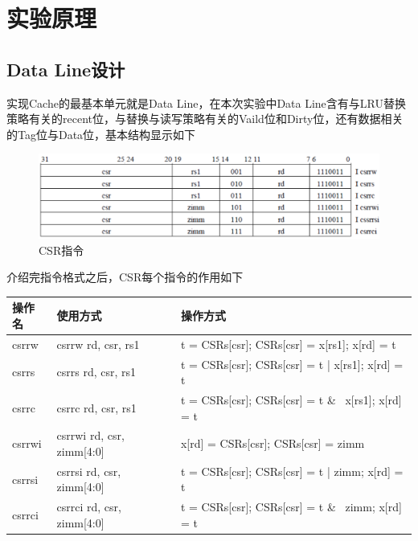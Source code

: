 
\section{实验原理}
\subsection{Data Line设计}
实现Cache的最基本单元就是Data Line，在本次实验中Data Line含有与LRU替换策略有关的recent位，与替换与读写策略有关的Vaild位和Dirty位，还有数据相关的Tag位与Data位，基本结构显示如下\\

\begin{figure}[H] %
    \centering %
    \includegraphics[width=1.0\textwidth]{figs/csr.png} %
    \caption{CSR指令} %
    \label{Fig.1} %
\end{figure}

介绍完指令格式之后，CSR每个指令的作用如下\\

\begin{tabular}{|l|l|l|}
    \hline
    操作名 & 使用方式 & 操作方式\\
    \hline
    csrrw & csrrw rd, csr, rs1 & t = CSRs[csr]; CSRs[csr] = x[rs1]; x[rd] = t \\
    \hline
    csrrs & csrrs rd, csr, rs1 & t = CSRs[csr]; CSRs[csr] = t | x[rs1]; x[rd] = t \\
    \hline
    csrrc & csrrc rd, csr, rs1  & t = CSRs[csr]; CSRs[csr] = t \& ~x[rs1]; x[rd] = t \\
    \hline
    csrrwi & csrrwi rd, csr, zimm[4:0] & x[rd] = CSRs[csr]; CSRs[csr] = zimm \\
    \hline
    csrrsi & csrrsi rd, csr, zimm[4:0] & t = CSRs[csr]; CSRs[csr] = t | zimm; x[rd] = t \\
    \hline 
    csrrci & csrrci rd, csr, zimm[4:0] & t = CSRs[csr]; CSRs[csr] = t \& ~zimm; x[rd] = t \\
    \hline
\end{tabular} \\


